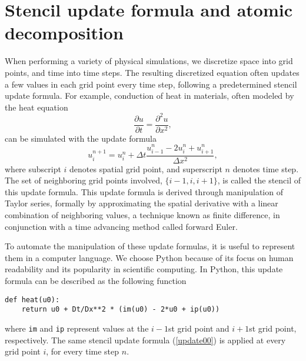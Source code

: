 \documentclass[review]{siamart0216}
\begin{document}
\section{Stencil update formula and atomic decomposition}
When performing a variety of physical simulations, we discretize space
into grid points, and time into time steps.  The resulting discretized
equation often updates a few values in each grid point every time step,
following a predetermined stencil update formula.
For example, conduction of heat in
materials, often modeled by the heat equation
\begin{equation}
\frac{\partial u}{\partial t} = \frac{\partial^2 u}{\partial x^2},
\end{equation}
can be simulated with the update formula
\begin{equation} \label{update00}
u_i^{n+1} = u_i^n + \Delta t \frac{u_{i-1}^n - 2 u_i^n + u_{i+1}^n}{\Delta x^2},
\end{equation}
where subscript $i$ denotes spatial grid point, and superscript $n$ denotes time step.  The set of neighboring grid points involved, $\{i-1, i, i+1\}$, is called the stencil of this update formula.
This update formula is derived through manipulation of Taylor series,
formally by approximating the spatial derivative with a linear combination
of neighboring values, a technique known as finite difference,
in conjunction with a time advancing method called forward Euler.

To automate the manipulation of these update formulas, it is useful to
represent them in a computer language.  We choose Python because of its
focus on human readability and its popularity in scientific computing.
In Python, this update formula can be described as the following function
\begin{lstlisting}
def heat(u0):
    return u0 + Dt/Dx**2 * (im(u0) - 2*u0 + ip(u0))
\end{lstlisting}
where \lstinline{im} and \lstinline{ip} represent values at the $i-1$st grid
point and $i+1$st grid point, respectively.
The same stencil update formula (\ref{update00}) is applied at every
grid point $i$, for every time step $n$.
\end{document}
